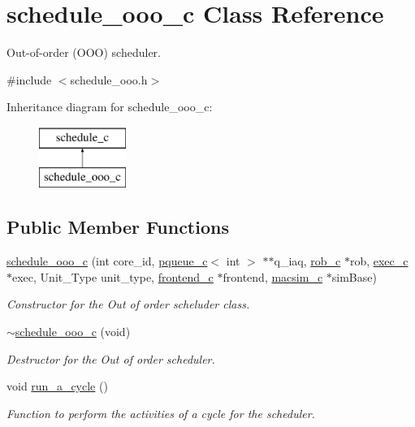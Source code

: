 \hypertarget{classschedule__ooo__c}{
\section{schedule\_\-ooo\_\-c Class Reference}
\label{classschedule__ooo__c}
}


Out-\/of-\/order (OOO) scheduler.  




{\ttfamily \#include $<$schedule\_\-ooo.h$>$}

Inheritance diagram for schedule\_\-ooo\_\-c:\begin{figure}[H]
\begin{center}
\leavevmode
\includegraphics[height=2.000000cm]{classschedule__ooo__c}
\end{center}
\end{figure}
\subsection*{Public Member Functions}
\begin{DoxyCompactItemize}
\item 
\hyperlink{classschedule__ooo__c_aec8a55262e3319c9090fa8f4837bebbc}{schedule\_\-ooo\_\-c} (int core\_\-id, \hyperlink{classpqueue__c}{pqueue\_\-c}$<$ int $>$ $\ast$$\ast$q\_\-iaq, \hyperlink{classrob__c}{rob\_\-c} $\ast$rob, \hyperlink{classexec__c}{exec\_\-c} $\ast$exec, Unit\_\-Type unit\_\-type, \hyperlink{classfrontend__c}{frontend\_\-c} $\ast$frontend, \hyperlink{classmacsim__c}{macsim\_\-c} $\ast$simBase)
\begin{DoxyCompactList}\small\item\em Constructor for the Out of order scheluder class. \item\end{DoxyCompactList}\item 
\hyperlink{classschedule__ooo__c_a2bb8139f29bfd8c5958170e3bd869a9e}{$\sim$schedule\_\-ooo\_\-c} (void)
\begin{DoxyCompactList}\small\item\em Destructor for the Out of order scheduler. \item\end{DoxyCompactList}\item 
void \hyperlink{classschedule__ooo__c_ae5d87735e3c75bca820797d8185f2dad}{run\_\-a\_\-cycle} ()
\begin{DoxyCompactList}\small\item\em Function to perform the activities of a cycle for the scheduler. \item\end{DoxyCompactList}\end{DoxyCompactItemize}
